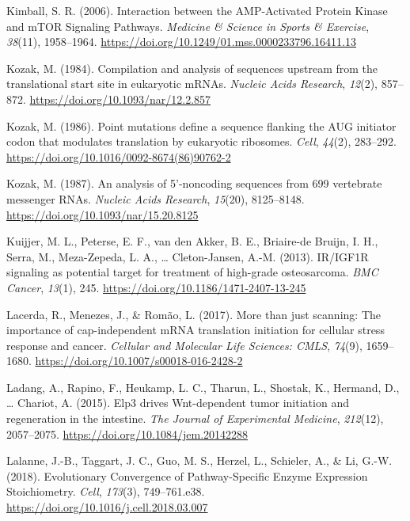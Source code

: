 \documentclass[12pt,openany]{book}
\begin{document}
\hypertarget{ref-Kimball2006}{}
Kimball, S. R. (2006). Interaction between the AMP-Activated Protein
Kinase and mTOR Signaling Pathways. \emph{Medicine \& Science in Sports
\& Exercise}, \emph{38}(11), 1958--1964.
\url{https://doi.org/10.1249/01.mss.0000233796.16411.13}

\hypertarget{ref-Kozak1984}{}
Kozak, M. (1984). Compilation and analysis of sequences upstream from
the translational start site in eukaryotic mRNAs. \emph{Nucleic Acids
Research}, \emph{12}(2), 857--872.
\url{https://doi.org/10.1093/nar/12.2.857}

\hypertarget{ref-Kozak1986}{}
Kozak, M. (1986). Point mutations define a sequence flanking the AUG
initiator codon that modulates translation by eukaryotic ribosomes.
\emph{Cell}, \emph{44}(2), 283--292.
\url{https://doi.org/10.1016/0092-8674(86)90762-2}

\hypertarget{ref-Kozak1987}{}
Kozak, M. (1987). An analysis of 5'-noncoding sequences from 699
vertebrate messenger RNAs. \emph{Nucleic Acids Research}, \emph{15}(20),
8125--8148. \url{https://doi.org/10.1093/nar/15.20.8125}

\hypertarget{ref-Kuijjer2013}{}
Kuijjer, M. L., Peterse, E. F., van den Akker, B. E., Briaire-de Bruijn,
I. H., Serra, M., Meza-Zepeda, L. A., \ldots{} Cleton-Jansen, A.-M.
(2013). IR/IGF1R signaling as potential target for treatment of
high-grade osteosarcoma. \emph{BMC Cancer}, \emph{13}(1), 245.
\url{https://doi.org/10.1186/1471-2407-13-245}

\hypertarget{ref-Lacerda2017}{}
Lacerda, R., Menezes, J., \& Romão, L. (2017). More than just scanning:
The importance of cap-independent mRNA translation initiation for
cellular stress response and cancer. \emph{Cellular and Molecular Life
Sciences: CMLS}, \emph{74}(9), 1659--1680.
\url{https://doi.org/10.1007/s00018-016-2428-2}

\hypertarget{ref-Ladang2015}{}
Ladang, A., Rapino, F., Heukamp, L. C., Tharun, L., Shostak, K.,
Hermand, D., \ldots{} Chariot, A. (2015). Elp3 drives Wnt-dependent
tumor initiation and regeneration in the intestine. \emph{The Journal of
Experimental Medicine}, \emph{212}(12), 2057--2075.
\url{https://doi.org/10.1084/jem.20142288}

\hypertarget{ref-Lalanne2018}{}
Lalanne, J.-B., Taggart, J. C., Guo, M. S., Herzel, L., Schieler, A., \&
Li, G.-W. (2018). Evolutionary Convergence of Pathway-Specific Enzyme
Expression Stoichiometry. \emph{Cell}, \emph{173}(3), 749--761.e38.
\url{https://doi.org/10.1016/j.cell.2018.03.007}
\end{document}
